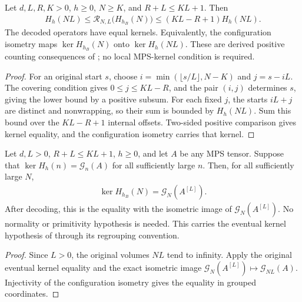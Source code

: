 \begin{lemma}
    \label{thm:blocked_interaction_comparison}
    \leanok
    Let $d,L,R,K>0$, $h\geq0$, $N\geq K$, and $R+L\leq KL+1$.
    Then
    \begin{align}
        H_h(NL)\leq\mathcal R_{N,L}\bigl(H_{h_B}(N)\bigr)
        \leq(KL-R+1)H_h(NL).
    \end{align}
    The decoded operators have equal kernels. Equivalently, the
    configuration isometry maps $\ker H_{h_B}(N)$ onto $\ker H_h(NL)$.
    These are derived positive counting consequences of
    \cite[Section~3, equations~(3.12)--(3.14)]{Nachtergaele1996Spectral};
    no local MPS-kernel condition is required.
\end{lemma}
\begin{proof}\leanok
    For an original start $s$, choose
    $i=\min(\lfloor s/L\rfloor,N-K)$ and $j=s-iL$.
    The covering condition gives $0\leq j\leq KL-R$, and the pair
    $(i,j)$ determines $s$, giving the lower bound by a positive subsum.
    For each fixed $j$, the starts $iL+j$ are distinct and nonwrapping,
    so their sum is bounded by $H_h(NL)$. Sum this bound over the
    $KL-R+1$ internal offsets. Two-sided positive comparison gives kernel
    equality, and the configuration isometry carries that kernel.
\end{proof}

\begin{lemma}
    \label{thm:blocked_interaction_eventual_kernel}
    \leanok
    Let $d,L>0$, $R+L\leq KL+1$, $h\geq0$, and let $A$ be any
    MPS tensor. Suppose that $\ker H_h(n)=\mathcal G_n(A)$ for all
    sufficiently large $n$. Then, for all sufficiently large $N$,
    \begin{align}
        \ker H_{h_B}(N)=\mathcal G_N(A^{[L]}).
    \end{align}
    After decoding, this is the equality with the isometric image of
    $\mathcal G_N(A^{[L]})$. No normality or primitivity hypothesis is needed.
    This carries the eventual kernel hypothesis of
    \cite[Theorem~1.2]{Nachtergaele1996Spectral} through its regrouping convention.
\end{lemma}
\begin{proof}\leanok
    Since $L>0$, the original volumes $NL$ tend to infinity. Apply the
    original eventual kernel equality and the exact isometric image
    $\mathcal G_N(A^{[L]})\mapsto\mathcal G_{NL}(A)$.
    Injectivity of the configuration isometry gives the equality in
    grouped coordinates.
\end{proof}

